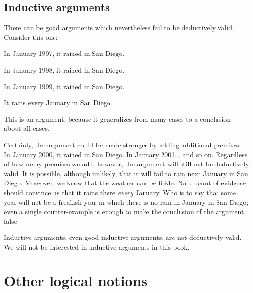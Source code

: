 

\subsection{Inductive arguments}

There can be good arguments which nevertheless fail to be deductively valid. Consider this one:

\begin{earg}
\item[] In January 1997, it rained in San Diego.
\item[] In January 1998, it rained in San Diego.
\item[] In January 1999, it rained in San Diego.
\item[\therefore] It rains every January in San Diego.
\end{earg}

This is an  argument, because it generalizes from many cases to a conclusion about all cases.

Certainly, the argument could be made stronger by adding additional premises: In January 2000, it rained in San Diego. In January 2001$\ldots$ and so on. Regardless of how many premises we add, however, the argument will still not be deductively valid. It is possible, although unlikely, that it will fail to rain next January in San Diego. Moreover, we know that the weather can be fickle. No amount of evidence should convince us that it rains there \emph{every} January. Who is to say that some year will not be a freakish year in which there is no rain in January in San Diego; even a single counter-example is enough to make the conclusion of the argument false.

Inductive arguments, even good inductive arguments, are not deductively valid. We will not be interested in inductive arguments in this book.


\section{Other logical notions}

